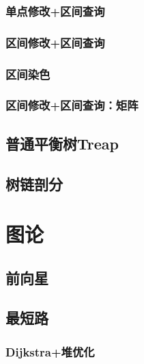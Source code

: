 \documentclass{article}
\begin{document}
\subsubsection{单点修改+区间查询}

\subsubsection{区间修改+区间查询}

\subsubsection{区间染色}

\subsubsection{区间修改+区间查询：矩阵}



\subsection{普通平衡树Treap}


\subsection{树链剖分}



\section{图论}

\subsection{﻿前向星}


\subsection{最短路}
\subsubsection{Dijkstra+堆优化}

\end{document}
